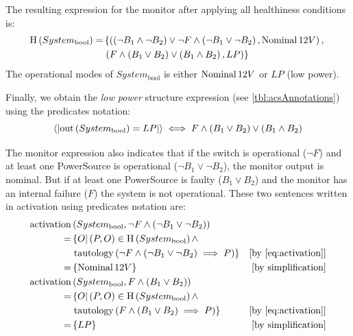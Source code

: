 \documentclass[12pt,openright,twoside,a4paper,oldfontcommands,english,brazil,final]{abntex2}
\theoremstyle{theo}
\def\healthinesscmd{\ensuremath\mathrm{H}}
\newcommand{\tautology}[1]{\ensuremath\mathrm{tautology}\left(#1\right)}
\newcommand{\Nominal}[1]{\ensuremath\mathop{\mathrm{Nominal}} #1}
\newcommand{\predicate}[2]{\ensuremath\left\langle\left| \mathrm{out}\left(#1\right) = #2 \right|\right\rangle}
\def\activationcmd{\ensuremath\mathrm{activation}}
\begin{document}
The resulting expression for the monitor after applying all healthiness conditions is:
\begin{equation}
\label{eq:h-system1}
\begin{split}
  \healthinesscmd\left(System_{\mathrm{bool}}\right) = & \left\{
    \left(\left(\lnot B_1 \land \lnot B_2\right) \lor 
      \lnot F \land \left(\lnot B_1 \lor \lnot B_2\right), \Nominal{12V}\right),\right.\\
    &\left.\left(F \land \left(B_1 \lor B_2\right) \lor \left(B_1 \land B_2\right), LP\right)
  \right\}
\end{split}
\end{equation}
%
The operational modes of $System_{\mathrm{bool}}$ is either $\Nominal{12V}$ or $LP$ (low power).

Finally, we obtain the \emph{low power} structure expression (see \cref{tbl:acsAnnotations}) using the predicates notation:
\[
\predicate{System_{\mathrm{bool}}}{LP} \iff
F \land \left(B_1 \lor B_2\right) \lor \left(B_1 \land B_2\right)
\]

The monitor expression also indicates that if the switch is operational ($\lnot F$) and at least one PowerSource is operational ($\lnot B_1 \lor \lnot B_2$), the monitor output is nominal.
But if at least one PowerSource is faulty ($B_1 \lor B_2$) and the monitor has an internal failure ($F$) the system is not operational.
These two sentences written in \ac{activation} using predicates notation are:
\begin{subequations}
\begin{align}
\activationcmd& \left(System_{\mathrm{bool}}, \lnot F \land \left(\lnot B_1 \lor \lnot B_2\right)\right) \nonumber\\
  = & \left\{ O | \left(P, O\right) \in \healthinesscmd\left(System_{\mathrm{bool}}\right) \land \right.\nonumber\\
    & \left.\tautology{\lnot F \land \left(\lnot B_1 \lor \lnot B_2\right) \implies P}
  \right\} & \text{[by \cref{eq:activation}]}\nonumber\\
  = & \left\{\Nominal{12V}\right\} & \text{[by simplification]}\\
\activationcmd& \left(System_{\mathrm{bool}}, F \land \left(B_1 \lor B_2\right) \right) \nonumber\\
  = & \left\{ O | \left(P, O\right) \in \healthinesscmd\left(System_{\mathrm{bool}}\right) \land \right.\nonumber\\
    & \left.\tautology{F \land \left(B_1 \lor B_2\right) \implies P}
  \right\} & \text{[by \cref{eq:activation}]}\nonumber\\
  = & \left\{LP\right\} & \text{[by simplification]}
\end{align}
\end{subequations}
\end{document}
